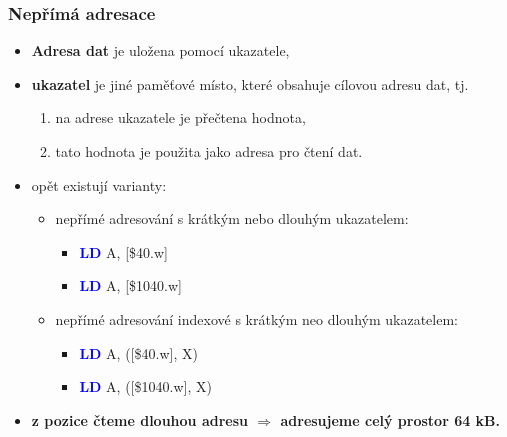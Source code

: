 	\begin{frame}
    \frametitle{Nepřímá adresace}
		
		\begin{itemize}
			\item \textbf{Adresa dat} je uložena pomocí ukazatele,
			\item \textbf{ukazatel} je jiné paměťové místo, které obsahuje cílovou adresu dat, tj.
				\begin{enumerate}
					\item na adrese ukazatele je přečtena hodnota,
					\item tato hodnota je použita jako adresa pro čtení dat.
				\end{enumerate}
				
			\vspace{3mm}
			\item opět existují varianty:
			
			\begin{itemize}
				\item nepřímé adresování s krátkým nebo dlouhým ukazatelem:
				
				\begin{itemize}
					\item \textcolor{blue}{\textbf{LD}} A, [\$40.w]
					\item \textcolor{blue}{\textbf{LD}} A, [\$1040.w]
				\end{itemize}
				
				\item nepřímé adresování indexové s krátkým neo dlouhým ukazatelem:
				\begin{itemize}
					\item \textcolor{blue}{\textbf{LD}} A, ([\$40.w], X)
					\item \textcolor{blue}{\textbf{LD}} A, ([\$1040.w], X)
				\end{itemize}
			\end{itemize}
			
			\vspace{3mm}
			\item \textbf{z  pozice čteme dlouhou adresu $\Rightarrow$ adresujeme celý prostor 64 kB.}
		\end{itemize}
		
	\end{frame}
	
